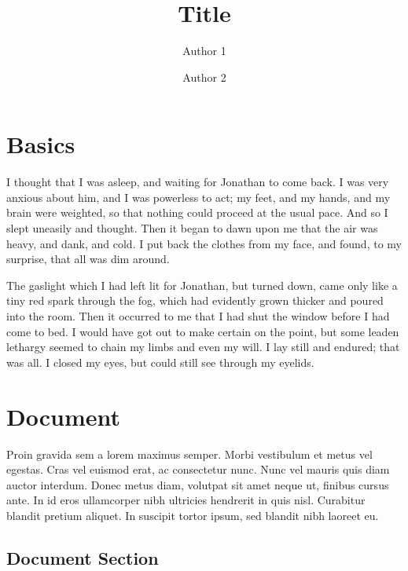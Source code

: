 \documentclass[12pt,a4paper]{book}
\title{Title}
\author{Author 1 \and Author 2}
\begin{document}
\maketitle

\chapter{Basics}




I thought that I was asleep, and waiting for Jonathan to come back.
I was very anxious about him, and I was powerless to act; my feet,
and my hands, and my brain were weighted, so that nothing could proceed
at the usual pace. And so I slept uneasily and thought. Then it began to
dawn upon me that the air was heavy, and dank, and cold. I put back the
clothes from my face, and found, to my surprise, that all was dim around.

The gaslight which I had left lit for Jonathan, but turned down, came only
like a tiny red spark through the fog, which had evidently grown thicker and
poured into the room. Then it occurred to me that I had shut the window before
I had come to bed. I would have got out to make certain on the point, but some
leaden lethargy seemed to chain my limbs and even my will. I lay still and endured;
that was all. I closed my eyes, but could still see through my eyelids.

\chapter{Document}

Proin gravida sem a lorem maximus semper. Morbi vestibulum et metus vel egestas.
Cras vel euismod erat, ac consectetur nunc. Nunc vel mauris quis diam auctor interdum.
Donec metus diam, volutpat sit amet neque ut, finibus cursus ante.
In id eros ullamcorper nibh ultricies hendrerit in quis nisl.
Curabitur blandit pretium aliquet. In suscipit tortor ipsum, sed blandit nibh laoreet eu.

\section{Document Section}
\end{document}
